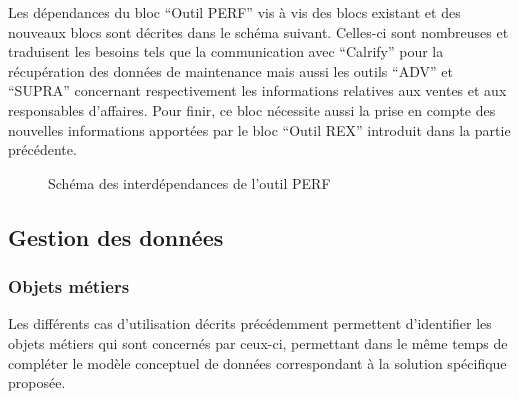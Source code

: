 Les dépendances du bloc “Outil PERF” vis à vis des blocs existant et des nouveaux blocs sont décrites dans le schéma suivant. Celles-ci sont nombreuses et traduisent les besoins tels que la communication avec “Calrify” pour la récupération des données de maintenance mais aussi les outils “ADV” et “SUPRA” concernant respectivement les informations relatives aux ventes et aux responsables d’affaires. Pour finir, ce bloc nécessite aussi la prise en compte des nouvelles informations apportées par le bloc “Outil REX” introduit dans la partie précédente.

\begin{figure}[H]
    \label{fig-dep-perf}
    \noindent{}
    \caption{Schéma des interdépendances de l'outil PERF}
\end{figure}

\subsection{Gestion des données}

\subsubsection{Objets métiers}

Les différents cas d’utilisation décrits précédemment permettent d’identifier les objets métiers qui sont concernés par ceux-ci, permettant dans le même temps de compléter le modèle conceptuel de données correspondant à la solution spécifique proposée.

